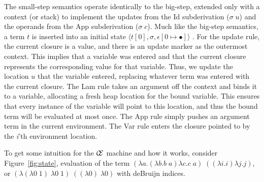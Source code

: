 The small-step semantics operate identically to the big-step, extended only with
a context (or stack) to implement the updates from the Id subderivation ($\sigma
\; u$) and the operands from the App subderivation ($\sigma \; c$).  Much like
the big-step semantics, a term $t$ is inserted into an initial state $\langle
t[0], \sigma, \epsilon[0\mapsto\bullet]\rangle$ . For the update rule, the
current closure is a value, and there is an update marker as the outermost
context.  This implies that a variable was entered and that the current closure
represents the corresponding value for that variable. Thus, we update the
location $u$ that the variable entered, replacing whatever term was entered with
the current closure.  The Lam rule takes an argument off the context and binds
it to a variable, allocating a fresh heap location for the bound variable. This
ensures that every instance of the variable will point to this location, and
thus the bound term will be evaluated at most once. The App rule simply pushes
an argument term in the current environment. The Var rule enters the closure
pointed to by the \textit{i}'th environment location.  

To get some intuition for the $\mathcal{\mathcal{C} \mskip -4mu \mathcal{E}}$
machine and how it works, consider Figure~\ref{fig:state}, evaluation of the
term $(\lambda a.(\lambda b.b \; a) \lambda c.c \; a) \; ((\lambda i.i)
\lambda j.j)$, or $(\lambda(\lambda0\;1)\;\lambda0\;1)\;((\lambda0)\;
\lambda0)$ with deBruijn indices.

